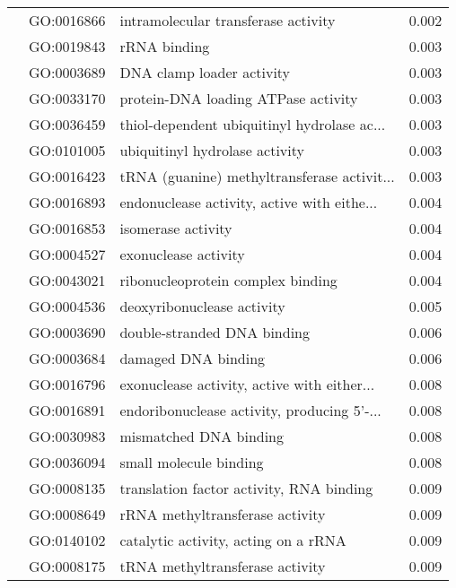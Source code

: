 \begin{longtable}{lllr}
   & GO:0016866 &          intramolecular transferase activity &         0.002 \\
   & GO:0019843 &                                 rRNA binding &         0.003 \\
   & GO:0003689 &                    DNA clamp loader activity &         0.003 \\
   & GO:0033170 &          protein-DNA loading ATPase activity &         0.003 \\
   & GO:0036459 &  thiol-dependent ubiquitinyl hydrolase ac... &         0.003 \\
   & GO:0101005 &               ubiquitinyl hydrolase activity &         0.003 \\
   & GO:0016423 &  tRNA (guanine) methyltransferase activit... &         0.003 \\
   & GO:0016893 &  endonuclease activity, active with eithe... &         0.004 \\
   & GO:0016853 &                           isomerase activity &         0.004 \\
   & GO:0004527 &                         exonuclease activity &         0.004 \\
   & GO:0043021 &            ribonucleoprotein complex binding &         0.004 \\
   & GO:0004536 &                   deoxyribonuclease activity &         0.005 \\
   & GO:0003690 &                  double-stranded DNA binding &         0.006 \\
   & GO:0003684 &                          damaged DNA binding &         0.006 \\
   & GO:0016796 &  exonuclease activity, active with either... &         0.008 \\
   & GO:0016891 &  endoribonuclease activity, producing 5'-... &         0.008 \\
   & GO:0030983 &                       mismatched DNA binding &         0.008 \\
   & GO:0036094 &                       small molecule binding &         0.008 \\
   & GO:0008135 &     translation factor activity, RNA binding &         0.009 \\
   & GO:0008649 &              rRNA methyltransferase activity &         0.009 \\
   & GO:0140102 &         catalytic activity, acting on a rRNA &         0.009 \\
   & GO:0008175 &              tRNA methyltransferase activity &         0.009 \\

\end{longtable}
